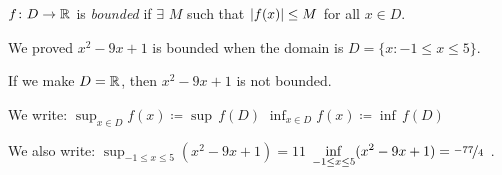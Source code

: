 \documentclass[10pt,aspectratio=169]{beamer}
\begin{document}
\begin{frame}

\begin{definition}
$f \colon D \to {\mathbb{R}}$ is
\emph{bounded}
if $\exists$ $M$
such that $\left\lvert {f(x)} \right\rvert \leq M$ for all $x \in D$.
\end{definition}

\pause

We proved $x^2-9x+1$ is bounded when the domain is $D = \{ x : -1 \leq x \leq 5 \}$.


\medskip
\pause

If we make $D={\mathbb{R}}$, then $x^2-9x+1$ is not bounded.

\medskip
\pause

We write: \quad 
$\displaystyle \sup_{x \in D} f(x) \coloneqq \sup\, f(D)$
\quad
$\displaystyle \inf_{x \in D} f(x) \coloneqq \inf\, f(D)$

\medskip
\pause

We also write: \quad 
$\displaystyle
\sup_{-1 \leq x \leq 5} ( x^2 -9x+1 ) = 11$
\quad
$\displaystyle\inf_{-1 \leq x \leq 5} ( x^2 -9x+1 ) = \nicefrac{-77}{4}$ .

\medskip
\pause

\begin{center}
\end{center}

\end{frame}
\end{document}
